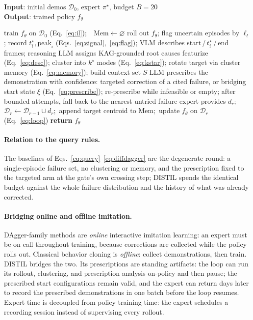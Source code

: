 \documentclass[letterpaper]{article} %
\begin{document}
\begin{algorithm}[tb]
\caption{The DISTIL loop (one demonstration per round).}
\label{alg:distil}
\textbf{Input}: initial demos $\mathcal{D}_0$, expert $\pi^\star$, budget
$B{=}20$\\
\textbf{Output}: trained policy $f_\theta$
\begin{algorithmic}[1]
\STATE train $f_\theta$ on $\mathcal{D}_0$ (Eq.~\ref{eq:il});\ \
$\mathrm{Mem}\leftarrow\varnothing$
  \STATE roll out $f_\theta$; flag uncertain episodes by $\ell_t$; record
  $t^\star_i,\mathrm{peak}_i$ (Eqs.~\ref{eq:signal},~\ref{eq:flag}); VLM
  describes start\,/\,$t^\star_i$\,/\,end frames; reasoning LLM assigns
  KAG-grounded root causes
  \STATE featurize (Eq.~\ref{eq:desc}); cluster into $k^\star$ modes
  (Eq.~\ref{eq:kstar}); rotate target via cluster memory
  (Eq.~\ref{eq:memory}); build context set $S$
  \STATE LLM prescribes the demonstration with confidence: targeted
  correction of a cited failure, or bridging start state $\xi$
  (Eq.~\ref{eq:prescribe}); re-prescribe while infeasible or empty; after
  bounded attempts, fall back to the nearest untried failure
  \STATE expert provides $d_r$;\ \
  $\mathcal{D}_r\leftarrow\mathcal{D}_{r-1}\cup d_r$;\ append target centroid
  to $\mathrm{Mem}$;\ update $f_\theta$ on $\mathcal{D}_r$ (Eq.~\ref{eq:loop})
\ENDFOR
\STATE \textbf{return} $f_\theta$
\end{algorithmic}
\end{algorithm}

\paragraph{Relation to the query rules.}
The baselines of Eqs.~\ref{eq:query}--\ref{eq:diffdagger} are the degenerate
round: a single-episode failure set, no clustering or memory, and the
prescription fixed to the targeted arm at the gate's own crossing step;
DISTIL spends the identical budget against the whole failure distribution
and the history of what was already corrected.

\paragraph{Bridging online and offline imitation.}
DAgger-family methods are \emph{online} interactive imitation learning: an
expert must be on call throughout training, because corrections are
collected while the policy rolls out. Classical behavior cloning is
\emph{offline}: collect demonstrations, then train. DISTIL bridges the two.
Its prescriptions are standing artifacts: the loop can run its rollout,
clustering, and prescription analysis on-policy and then pause; the
prescribed start configurations remain valid, and the expert can return days
later to record the prescribed demonstrations in one batch before the loop
resumes. Expert time is decoupled from policy training time: the expert
schedules a recording session instead of supervising every rollout.
\end{document}
